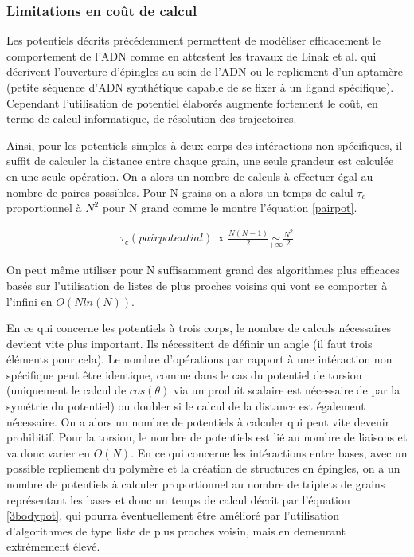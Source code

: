 \subsubsection{Limitations en coût de calcul}

Les potentiels décrits précédemment permettent de modéliser efficacement le comportement de l'ADN comme en attestent les travaux de Linak et al. \cite{jchem} qui décrivent l'ouverture d'épingles au sein de l'ADN ou le repliement d'un aptamère (petite séquence d'ADN synthétique capable de se fixer à un ligand spécifique). Cependant l'utilisation de potentiel élaborés augmente fortement le coût, en terme de calcul informatique, de résolution des trajectoires.

Ainsi, pour les potentiels simples à deux corps des intéractions non spécifiques, il suffit de calculer la distance entre chaque grain, une seule grandeur est calculée en une seule opération. On a alors un nombre de calculs à effectuer égal au nombre de paires possibles. Pour N grains on a alors un temps de calul $\tau_c$ proportionnel à $N^2$ pour N grand comme le montre l'équation \ref{pairpot}.

\begin{eqnarray}
\tau_c(pairpotential) \propto \frac{N(N-1)}{2} \underset{+\infty}{\sim} \frac{N^2}{2}
\label{pairpot}
\end{eqnarray}

On peut même utiliser pour N suffisamment grand des algorithmes plus efficaces basés sur l'utilisation de listes de plus proches voisins \cite{Vaidya1989} qui vont se comporter à l'infini en $O(Nln(N))$.

En ce qui concerne les potentiels à trois corps, le nombre de calculs nécessaires devient vite plus important. Ils nécessitent de définir un angle (il faut trois éléments pour cela). Le nombre d'opérations par rapport à une intéraction non spécifique peut être identique, comme dans le cas du potentiel de torsion (uniquement le calcul de $cos(\theta)$ via un produit scalaire est nécessaire de par la symétrie du potentiel) ou doubler si le calcul de la distance est également nécessaire. On a alors un nombre de potentiels à calculer qui peut vite devenir prohibitif. Pour la torsion, le nombre de potentiels est lié au nombre de liaisons et va donc varier en $O(N)$. En ce qui concerne les intéractions entre bases, avec un possible repliement du polymère et la création de structures en épingles, on a un nombre de potentiels à calculer proportionnel au nombre de triplets de grains représentant les bases et donc un temps de calcul décrit par l'équation \ref{3bodypot}, qui pourra éventuellement être amélioré par l'utilisation d'algorithmes de type liste de plus proches voisin, mais en demeurant extrémement élevé.

